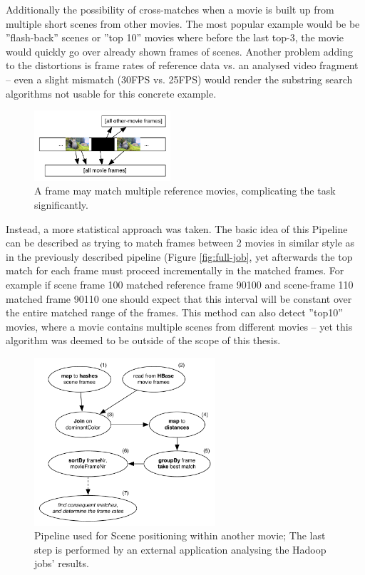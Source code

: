 Additionally the possibility of cross-matches when a movie is built up from multiple short scenes from other movies. The most popular example would be be ''flash-back'' scenes or ''top 10'' movies where before the last top-3, the movie would quickly go over already shown frames of scenes. Another problem adding to the distortions is frame rates of reference data vs. an analysed video fragment -- even a slight mismatch (30FPS vs. 25FPS) would render the substring search algorithms not usable for this concrete example.

\begin{figure}[ch!]
  \centering
  \includegraphics[width=0.45\textwidth]{img/frames-timeline-matching-missmatch}
  \caption{A frame may match multiple reference movies, complicating the task significantly.}
\end{figure}



Instead, a more statistical approach was taken. The basic idea of this Pipeline can be described as trying to match frames between 2 movies in similar style as in the previously described pipeline (Figure \ref{fig:full-job}, yet afterwards the top match for each frame must proceed incrementally in the matched frames. For example if scene frame 100 matched reference frame 90100 and scene-frame 110 matched frame 90110 one should expect that this interval will be constant over the entire matched range of the frames. This method can also detect ''top10'' movies, where a movie contains multiple scenes from different movies -- yet this algorithm was deemed to be outside of the scope of this thesis.


\begin{figure}[ch!]
  \centering
  \includegraphics[width=0.6\textwidth]{img/top-match-job-positioning}
  \caption{Pipeline used for Scene positioning within another movie; The last step is performed by an external application analysing the Hadoop jobs' results.}
  \label{fig:job-scene}
\end{figure}

